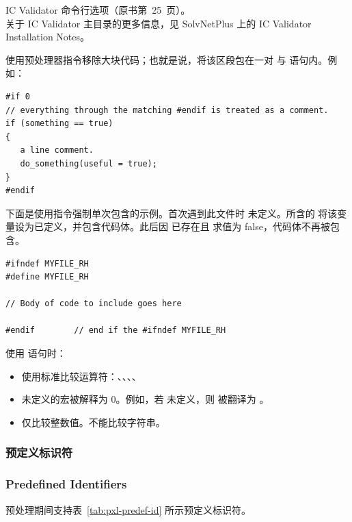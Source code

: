 \begin{seeAlsoBox}
IC Validator 命令行选项（原书第~25~页）。\\
关于 IC Validator 主目录的更多信息，见 SolvNetPlus 上的 IC Validator Installation Notes。
\end{seeAlsoBox}

使用预处理器指令移除大块代码；也就是说，将该区段包在一对  与  语句内。例如：
\begin{lstlisting}[style=pxl]
#if 0
// everything through the matching #endif is treated as a comment.
if (something == true)
{
   a line comment.
   do_something(useful = true);
}
#endif
\end{lstlisting}

下面是使用指令强制单次包含的示例。首次遇到此文件时  未定义。所含的  将该变量设为已定义，并包含代码体。此后因  已存在且  求值为 false，代码体不再被包含。
\begin{lstlisting}[style=pxl]
#ifndef MYFILE_RH
#define MYFILE_RH

// Body of code to include goes here

#endif        // end if the #ifndef MYFILE_RH
\end{lstlisting}

使用  语句时：
\begin{itemize}
  \item 使用标准比较运算符：\cmd{==}、\cmd{<=}、\cmd{>=}、\cmd{\&\&}、\cmd{||}
  \item 未定义的宏被解释为 0。例如，若  未定义，则  被翻译为 。
  \item 仅比较整数值。不能比较字符串。
\end{itemize}

\subsubsection{预定义标识符}
\subsubsection*{Predefined Identifiers}

预处理期间支持表~\ref{tab:pxl-predef-id} 所示预定义标识符。

